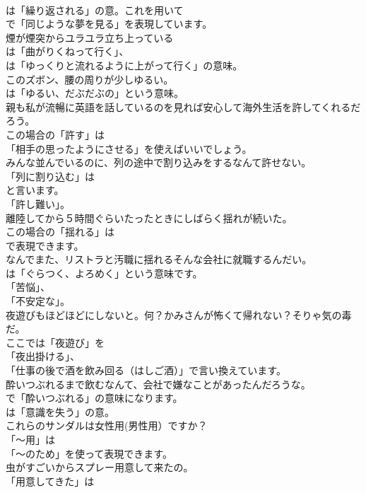 \documentclass[8pt]{extreport}
\begin{document}
\begin{CJK}{UTF8}{min}
\\	は「繰り返される」の意。これを用いて
\\	で「同じような夢を見る」を表現しています。	
\\	煙が煙突からユラユラ立ち上っている 
\\	は「曲がりくねって行く」、
\\	は「ゆっくりと流れるように上がって行く」の意味。	
\\	このズボン、腰の周りが少しゆるい。 
\\	は「ゆるい、だぶだぶの」という意味。	
\\	親も私が流暢に英語を話しているのを見れば安心して海外生活を許してくれるだろう。 
\\	この場合の「許す」は
\\	「相手の思ったようにさせる」を使えばいいでしょう。	
\\	みんな並んでいるのに、列の途中で割り込みをするなんて許せない。 
\\	「列に割り込む」は
\\	と言います。
\\	「許し難い」。	
\\	離陸してから５時間ぐらいたったときにしばらく揺れが続いた。 
\\	この場合の「揺れる」は 
\\	で表現できます。	
\\	なんでまた、リストラと汚職に揺れるそんな会社に就職するんだい。 
\\	は「ぐらつく、よろめく」という意味です。
\\	「苦悩」、
\\	「不安定な」。	
\\	夜遊びもほどほどにしないと。何？かみさんが怖くて帰れない？そりゃ気の毒だ。 
\\	ここでは「夜遊び」を
\\	「夜出掛ける」、
\\	「仕事の後で酒を飲み回る（はしご酒）」で言い換えています。	
\\	酔いつぶれるまで飲むなんて、会社で嫌なことがあったんだろうな。 
\\	で「酔いつぶれる」の意味になります。
\\	は「意識を失う」の意。	
\\	これらのサンダルは女性用(男性用）ですか？ 
\\	「～用」は
\\	「～のため」を使って表現できます。	
\\	虫がすごいからスプレー用意して来たの。 
\\	「用意してきた」は

\end{CJK}
\end{document}
